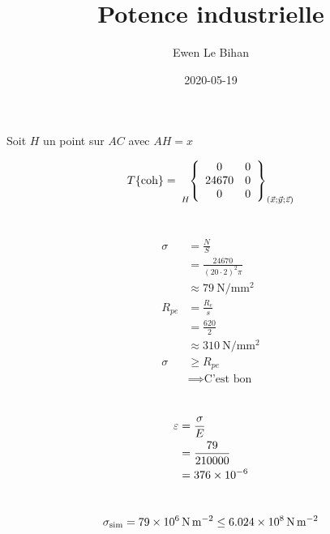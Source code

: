 \documentclass{article}
\title{Potence industrielle}
\author{Ewen Le Bihan}
\date{2020-05-19}
\newcommand{\torseur}[7]{
\tensor[_{#1}]{\left\{ \begin{array}{cc}
    #2 & #5 \\
    #3 & #6 \\
    #4 & #7
\end{array} \right\}}{_{(\vec{x};\vec{y};\vec{z})}}
}
\begin{document}
\maketitle

\section{}

Soit $H$ un point sur $AC$ avec $AH = x$

\[
	T\{\text{coh}\} = \torseur{H}{0}{24670}{0}{0}{0}{0}
\]

\section{}

\begin{equation*}
	\begin{split}
		\sigma &= \frac{N}{S} \\
		       &= \frac{24670}{(20\cdot2)^2\pi} \\
		       &\approx \SI{79}{\newton\per\milli\meter\squared} \\
		R_{pe} &= \frac{R_e}{s} \\
		       &= \frac{620}{2} \\
		       &\approx \SI{310}{\newton\per\milli\meter\squared} \\
		\sigma &\geq R_{pe} \\
		       &\implies \text{C'est bon}
	\end{split}
\end{equation*}

\section{}

\begin{equation*}
	\begin{split}
		\varepsilon &= \frac{\sigma}{E} \\
			 &= \frac{79}{210 000} \\
			 &= \SI{376E-6}{}
	\end{split}
\end{equation*}

\section{}

\[
	\sigma_{\text{sim}} = \SI{79E6}{\newton\per\meter\squared} \leq \SI{6.024E8}{\newton\per\meter\squared}
\]
\end{document}
